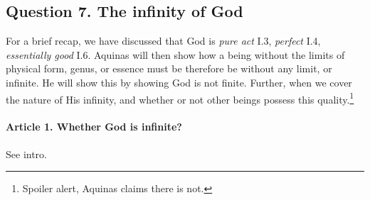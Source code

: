 \documentclass{ucetd}
\begin{document}
\subsection{Question 7. The infinity of God}
For a brief recap, we have discussed that God is \textit{pure act} I.3, \textit{perfect} I.4, \textit{essentially good} I.6. Aquinas will then show how a being without the limits of physical form, genus, or essence must be therefore be without any limit, or infinite. He will show this by showing God is not finite. Further, when we cover the nature of His infinity, and whether or not other beings possess this quality.\footnote{Spoiler alert, Aquinas claims there is not.}

\paragraph{Article 1. Whether God is infinite?}
See intro.
\end{document}
